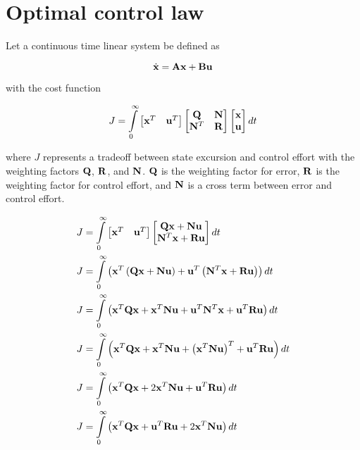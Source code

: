 \section{Optimal control law}
\label{sec:deriv_optimal_control_law}

Let a continuous time linear \gls{system} be defined as

\begin{equation}
  \dot{\mathbf{x}} = \mathbf{A}\mathbf{x} + \mathbf{B}\mathbf{u}
\end{equation}

with the cost function

\begin{equation*}
  J = \int\limits_0^\infty
    \begin{bmatrix}
      \mathbf{x}^T & \mathbf{u}^T
    \end{bmatrix}
    \begin{bmatrix}
      \mathbf{Q} & \mathbf{N} \\
      \mathbf{N}^T & \mathbf{R}
    \end{bmatrix}
    \begin{bmatrix}
      \mathbf{x} \\
      \mathbf{u}
    \end{bmatrix} dt
\end{equation*}

where $J$ represents a tradeoff between \gls{state} excursion and
\gls{control effort} with the weighting factors $\mathbf{Q}$, $\mathbf{R}$, and
$\mathbf{N}$. $\mathbf{Q}$ is the weighting factor for \gls{error}, $\mathbf{R}$ is the
weighting factor for \gls{control effort}, and $\mathbf{N}$ is a cross term between
\gls{error} and \gls{control effort}.

\begin{align*}
  J &= \int\limits_0^\infty
    \begin{bmatrix}
      \mathbf{x}^T & \mathbf{u}^T
    \end{bmatrix}
    \begin{bmatrix}
      \mathbf{Q}\mathbf{x} + \mathbf{N}\mathbf{u} \\
      \mathbf{N}^T\mathbf{x} + \mathbf{R}\mathbf{u}
    \end{bmatrix} dt \\
  J &= \int\limits_0^\infty
    \left(\mathbf{x}^T\left(\mathbf{Q}\mathbf{x} + \mathbf{N}\mathbf{u}\right) +
      \mathbf{u}^T\left(\mathbf{N}^T\mathbf{x} + \mathbf{R}\mathbf{u}\right)\right) dt \\
  J &= \int\limits_0^\infty
    \left(\mathbf{x}^T\mathbf{Q}\mathbf{x} + \mathbf{x}^T\mathbf{N}\mathbf{u} +
      \mathbf{u}^T\mathbf{N}^T\mathbf{x} + \mathbf{u}^T\mathbf{R}\mathbf{u}\right) dt \\
  J &= \int\limits_0^\infty
    \left(\mathbf{x}^T\mathbf{Q}\mathbf{x} + \mathbf{x}^T\mathbf{N}\mathbf{u} +
      \left(\mathbf{x}^T\mathbf{N}\mathbf{u}\right)^T + \mathbf{u}^T\mathbf{R}\mathbf{u}\right)
    dt \\
  J &= \int\limits_0^\infty
    \left(\mathbf{x}^T\mathbf{Q}\mathbf{x} + 2\mathbf{x}^T\mathbf{N}\mathbf{u} +
      \mathbf{u}^T\mathbf{R}\mathbf{u}\right) dt \\
  J &= \int\limits_0^\infty
    \left(\mathbf{x}^T\mathbf{Q}\mathbf{x} + \mathbf{u}^T\mathbf{R}\mathbf{u} +
      2\mathbf{x}^T\mathbf{N}\mathbf{u}\right) dt
\end{align*}


